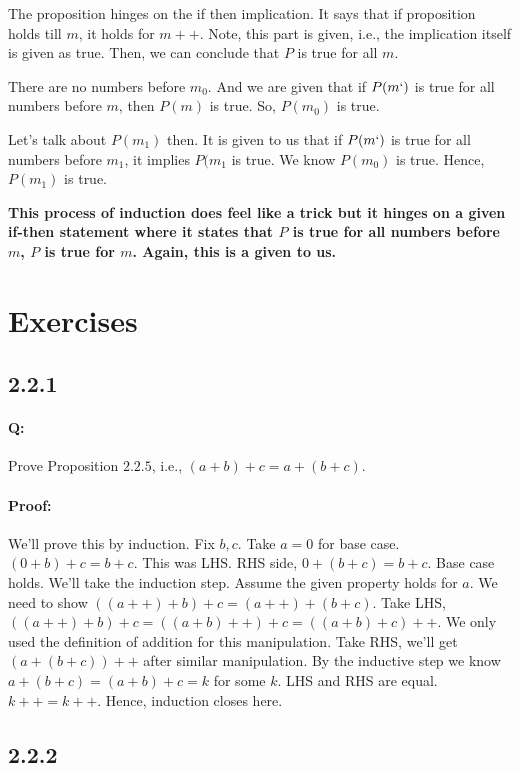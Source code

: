 \documentclass{report}
\begin{document}
The proposition hinges on the if then implication. It says that if proposition holds till $m$, it holds for $m++$. Note, this part is given, i.e., the implication itself is given as true. Then, we can conclude that $P$ is true for all $m$.


There are no numbers before $m_0$. And we are given that if  $P(m`)$ is true for all numbers before $m$, then $P(m)$ is true. So,  $P(m_0)$ is true. 

Let's talk about $P(m_1)$ then. It is given to us that if  $P(m`)$ is true for all numbers before  $m_1$, it implies $P(m_1$ is true. We know $P(m_0)$ is true. Hence, $P(m_1)$ is true.

\textbf{This process of induction does feel like a trick but it hinges on a given if-then statement where it states that $P$ is true for all numbers before $m$, $P$ is true for $m$. Again, this is a given to us.}


\section*{Exercises}
\subsection*{2.2.1}
 \paragraph{Q: } Prove Proposition $2.2.5$, i.e., $\left( a+b \right) +c = a + \left( b+c \right) $.

\paragraph{Proof: } We'll prove this by induction. Fix $b,c$. Take $a=0$ for base case. $\left( 0+b \right) +c = b +c $. This was LHS. RHS side, $0+(b+c) = b+c$. Base case holds. We'll take the induction step. Assume the given property holds for $a$. We need to show  $\left( \left( a++ \right) +b \right) +c = \left( a++ \right) + \left( b+c \right) $.
Take LHS, $\left( \left( a++ \right) +b \right) +c  = (\left( a+b \right) ++)+c = \left( (a+b)+c \right)++$. We only used the definition of addition for this manipulation. Take RHS, we'll get $\left( a+(b+c) \right)++ $ after similar manipulation. By the inductive step we know $a+(b+c) = (a+b)+c = k$ for some  $k$. LHS and RHS are equal. $k++ = k++$. Hence, induction closes here.

\subsection*{2.2.2}
\end{document}
